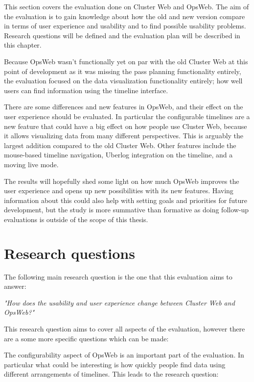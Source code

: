 
This section covers the evaluation done on Cluster Web and OpsWeb. The aim of the evaluation is to gain knowledge about how the old and new version compare in terms of user experience and usability and to find possible usability problems. Research questions will be defined and the evaluation plan will be described in this chapter.

Because OpsWeb wasn't functionally yet on par with the old Cluster Web at this point of development as it was missing the pass planning functionality entirely, the evaluation focused on the data visualization functionality entirely; how well users can find information using the timeline interface.

There are some differences and new features in OpsWeb, and their effect on the user experience should be evaluated. In particular the configurable timelines are a new feature that could have a big effect on how people use Cluster Web, because it allows visualizing data from many different perspectives. This is arguably the largest addition compared to the old Cluster Web. Other features include the mouse-based timeline navigation, Uberlog integration on the timeline, and a moving live mode.

The results will hopefully shed some light on how much OpsWeb improves the user experience and opens up new possibilities with its new features. Having information about this could also help with setting goals and priorities for future development, but the study is more summative than formative as doing follow-up evaluations is outside of the scope of this thesis. \cite{albert2013measuring}

\section{Research questions} \label{research_questions}
The following main research question is the one that this evaluation aims to answer:

\textit{"How does the usability and user experience change between Cluster Web and OpsWeb?"}

This research question aims to cover all aspects of the evaluation, however there are a some more specific questions which can be made:

The configurability aspect of OpsWeb is an important part of the evaluation. In particular what could be interesting is how quickly people find data using different arrangements of timelines. This leads to the research question:

